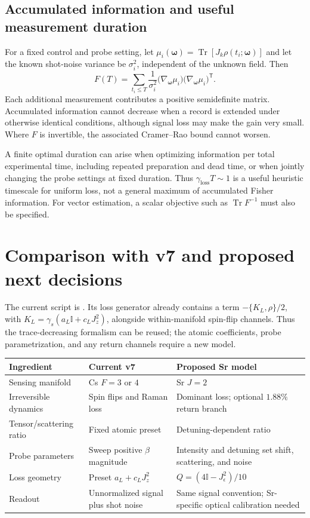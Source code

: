 \documentclass[11pt,letterpaper]{article}
\newcommand{\Tr}{\operatorname{Tr}}
\newcommand{\id}{\mathbb{I}}
\newcommand{\Je}{J_{\epsilon}}
\newcommand{\Jk}{J_k}
\begin{document}
\subsection*{Accumulated information and useful measurement duration}
For a fixed control and probe setting, let
$\mu_i(\bm\omega)=\Tr[\Jk\rho(t_i;\bm\omega)]$ and let the known shot-noise
variance be $\sigma_i^2$, independent of the unknown field. Then
\begin{equation}
F(T)=\sum_{t_i\le T}\frac{1}{\sigma_i^2}
\bigl(\nabla_{\bm\omega}\mu_i\bigr)
\bigl(\nabla_{\bm\omega}\mu_i\bigr)^{\mathsf T}.
\label{eq:fisher}
\end{equation}
Each additional measurement contributes a positive semidefinite matrix.
Accumulated information cannot decrease when a record is extended under
otherwise identical conditions, although signal loss may make the gain very
small. Where $F$ is invertible, the associated Cramer--Rao bound cannot worsen.

A finite optimal duration can arise when optimizing information per total
experimental time, including repeated preparation and dead time, or when
jointly changing the probe settings at fixed duration. Thus
$\gamma_{\mathrm{loss}}T\sim1$ is a useful heuristic timescale for uniform
loss, not a general maximum of accumulated Fisher information. For vector
estimation, a scalar objective such as $\Tr F^{-1}$ must also be specified.

\newpage
\section{Comparison with v7 and proposed next decisions}

The current script is
.
Its loss generator already contains a term $-\{K_L,\rho\}/2$, with
$K_L=\gamma_s(a_L\id+c_LJ_z^2)$, alongside within-manifold spin-flip channels.
Thus the trace-decreasing formalism can be reused; the atomic coefficients,
probe parametrization, and any return channels require a new model.

\begin{center}
\begin{tabularx}{\textwidth}{@{}lYY@{}}
\toprule
Ingredient & Current v7 & Proposed Sr model\\
\midrule
Sensing manifold & Cs $F=3$ or $4$ & Sr $J=2$\\
Irreversible dynamics & Spin flips and Raman loss & Dominant loss; optional $1.88\%$ return branch\\
Tensor/scattering ratio & Fixed atomic preset & Detuning-dependent ratio\\
Probe parameters & Sweep positive $\beta$ magnitude & Intensity and detuning set shift, scattering, and noise\\
Loss geometry & Preset $a_L+c_LJ_z^2$ & $Q=(4\id-\Je^2)/10$\\
Readout & Unnormalized signal plus shot noise & Same signal convention; Sr-specific optical calibration needed\\
\bottomrule
\end{tabularx}
\end{center}
\end{document}
